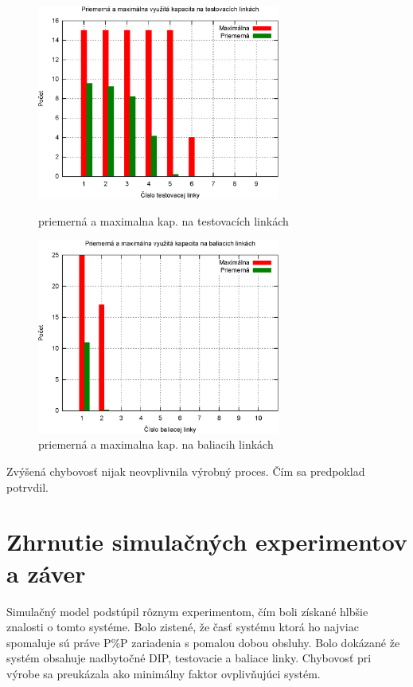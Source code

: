 \documentclass[12pt,a4paper,titlepage,final]{article}
\begin{document}
\begin{figure}[!ht]
  \centering
  \begin{minipage}{0.45\linewidth}
  \centering
  \includegraphics[width=8cm]{doc/4_hist5.eps}
  \caption{priemerná a maximalna kap. na testovacích linkách}
  \end{minipage}
  \quad
  \begin{minipage}{0.45\linewidth}
    \centering
    \includegraphics[width=8cm]{doc/4_hist6.eps}
    \caption{priemerná a maximalna kap. na baliacih linkách}
  \end{minipage}
\end{figure}

Zvýšená chybovosť nijak neovplivnila výrobný proces. Čím sa predpoklad potrvdil.

\section{Zhrnutie simulačných experimentov a záver}
Simulačný model podstúpil rôznym experimentom, čím boli získané hlbšie znalosti
o tomto systéme. Bolo zistené, že časť systému ktorá ho najviac spomaluje sú práve P\%P 
zariadenia s pomalou dobou obsluhy. Bolo dokázané že systém obsahuje nadbytočné
DIP, testovacie a baliace linky. Chybovosť pri výrobe sa preukázala ako minimálny
faktor ovplivňujúci systém.
\end{document}
